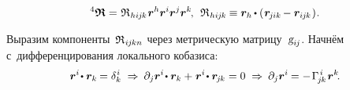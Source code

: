 \begin{otherlanguage}{russian}
\nopagebreak\vspace{-0.1em}\begin{equation}\label{riemanncurvaturetensor}
{^4\bm{\mathfrak{R}}} = \hspace{.12ex} \mathfrak{R}_{\hspace{.1ex}hi\hspace{-0.1ex}j\hspace{-0.1ex}k} \hspace{.12ex} \bm{r}^h \bm{r}^i \bm{r}^j \bm{r}^k \hspace{-0.25ex},
\:\:
\mathfrak{R}_{\hspace{.1ex}hi\hspace{-0.1ex}j\hspace{-0.1ex}k} \hspace{-0.12ex} \equiv
\bm{r}_h \hspace{-0.15ex} \dotp \left( \hspace{.12ex} \bm{r}_{\hspace{-0.2ex}j\hspace{-0.06ex}ik} \hspace{-0.2ex} - \bm{r}_{i\hspace{-0.1ex}j\hspace{-0.1ex}k} \hspace{.12ex} \right)
\hspace{-0.3ex} .
\end{equation}

Выразим компоненты~${\mathfrak{R}_{\hspace{.1ex}i\hspace{-0.1ex}j\hspace{-0.1ex}kn}}$ через метрическую матрицу~${\textsl{g}_{i\hspace{-0.1ex}j}}$. Начнём с~дифференцирования локального кобазиса:
\[ \bm{r}^i \hspace{-0.32ex} \dotp \bm{r}_k \hspace{-0.16ex} = \delta_k^{\hspace{0.1ex}i} \;\Rightarrow\:
\partial_j \bm{r}^i \hspace{-0.32ex} \dotp \bm{r}_k + \hspace{.1ex} \bm{r}^i \hspace{-0.32ex} \dotp \bm{r}_{\hspace{-0.2ex}j\hspace{-0.1ex}k} = 0 \;\Rightarrow\:
\partial_j \bm{r}^i \hspace{-0.12ex} = - \hspace{.2ex} \Gamma_{\hspace{-0.25ex}j\hspace{-0.1ex}k}^{\hspace{.25ex}i} \hspace{.2ex} \bm{r}^k
\hspace{-0.4ex}. \]


\end{otherlanguage}
